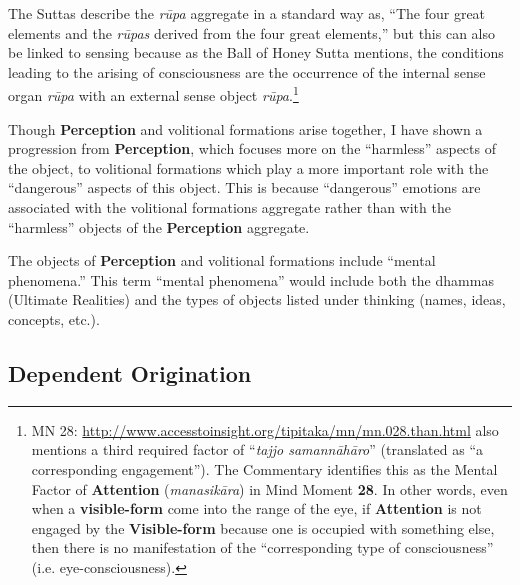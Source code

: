 The Suttas describe the \textit{rūpa} aggregate in a standard way as, “The four great elements and the \textit{rūpas} derived from the four great elements,” but this can also be linked to sensing because as the Ball of Honey Sutta mentions, the conditions leading to the arising of consciousness are the occurrence of the internal sense organ \textit{rūpa} with an external sense object \textit{rūpa}.\footnote{MN 28: \url{http://www.accesstoinsight.org/tipitaka/mn/mn.028.than.html} also mentions a third required factor of “\textit{tajjo samannāhāro}” (translated as “a corresponding engagement”). The Commentary identifies this as the Mental Factor of \textbf{Attention} (\textit{manasikāra}) in Mind Moment \textbf{28}. In other words, even when a \textbf{visible-form} come into the range of the eye, if \textbf{Attention} is not engaged by the \textbf{Visible-form} because one is occupied with something else, then there is no manifestation of the “corresponding type of consciousness” (i.e. eye-consciousness).}

Though \textbf{Perception} and volitional formations arise together, I have shown a progression from \textbf{Perception}, which focuses more on the “harmless” aspects of the object, to volitional formations which play a more important role with the “dangerous” aspects of this object. This is because “dangerous” emotions are associated with the volitional formations aggregate rather than with the “harmless” objects of the \textbf{Perception} aggregate.

The objects of \textbf{Perception} and volitional formations include “mental phenomena.” This term “mental phenomena” would include both the dhammas (Ultimate Realities) and the types of objects listed under thinking (names, ideas, concepts, etc.).

\subsection*{Dependent Origination}

